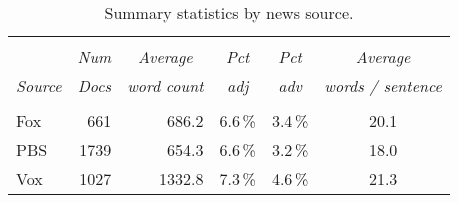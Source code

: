 \begin{table}[H]
    \caption{Summary statistics by news source. }
    \label{tab:summary}
    \centering
    \begin{tabular}{l|r|r|r|r|c} \hline \hline
             & &      &                                       &                                        &                                            \\
             &  \multicolumn{1}{c|}{\textit{Num}} & \multicolumn{1}{c|}{\textit{Average}}        &   \multicolumn{1}{c|}{\textit{Pct}}            &  \multicolumn{1}{c|}{\textit{Pct}}      & \multicolumn{1}{c}{\textit{Average}}             \\
    \textit{Source}   & \multicolumn{1}{c|}{\textit{Docs}} & \multicolumn{1}{c|}{\textit{word count}} & \multicolumn{1}{c|}{\textit{adj}}   & \multicolumn{1}{c|}{\textit{adv}}       & \multicolumn{1}{c}{\textit{words / sentence}}          \\ \hline 
             &                                &                                 &                                       &                                        &                                            \\
    Fox      & 661                            & 686.2                           & 6.6\,\%                               & 3.4\,\%                                & 20.1                                       \\
    PBS      & 1739                           & 654.3                           & 6.6\,\%                               & 3.2\,\%                                & 18.0                                       \\
    Vox      & 1027                           & 1332.8                          & 7.3\,\%                               & 4.6\,\%                                & 21.3                                       \\ \hline  
    \end{tabular}
\end{table}